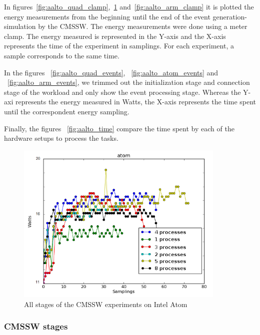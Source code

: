 In figures~\ref{fig:aalto_quad_clamp},~\ref{fig:aalto_atom_clamp} 
and~\ref{fig:aalto_arm_clamp} it is plotted the energy measurements from the beginning until the end of the event generation-simulation by the CMSSW. The energy measurements were done using a meter clamp. The energy measured is represented in the Y-axis and the X-axis represents the time of the experiment in samplings. For each experiment, a sample corresponds to the same time.

In the figures ~\ref{fig:aalto_quad_events}, ~\ref{fig:aalto_atom_events} and ~\ref{fig:aalto_arm_events}, we trimmed out the initialization stage and connection stage of the workload and only show the event processing stage. Whereas the Y-axi represents the energy measured in Watts, the X-axis represents the time spent until the correspondent energy sampling.

Finally, the figures ~\ref{fig:aalto_time} compare the time spent by each of the hardware setups to process the tasks.

\begin{figure}[h]
  \centering
    \includegraphics[width=100mm]{"img/aalto/aalto_total_atom"}
    \caption{All stages of the CMSSW experiments on Intel Atom}
    \label{fig:aalto_atom_clamp}
\end{figure}


\subsubsection*{CMSSW stages}

